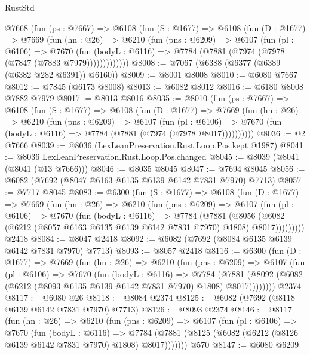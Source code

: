 \begin{lexlean}{RustStd}
\begin{coremodule}
    @7668
      (fun (ps : @7667) =>
      @6108
        (fun (S : @1677) =>
        @6108
          (fun (D : @1677) =>
          @7669
            (fun (hn : @26) =>
            @6210
              (fun (pns : @6209) =>
              @6107
                (fun (pl : @6106) =>
                @7670
                  (fun (bodyL : @6116) =>
                  @7784 (@7881 (@7974 (@7978 (@7847 (@7883 @7979)))))))))))))
@8008 := @7067 (@6388 (@6377 (@6389 (@6382 @282 @6391)) @6160))
@8009 := @8001 @8008
@8010 := @6080 @7667
@8012 := @7845 (@6173 @8008)
@8013 := @6082 @8012
@8016 := @6180 @8008 @7882 @7979
@8017 := @8013 @8016
@8035 := @8010
    (fun (ps : @7667) =>
    @6108
      (fun (S : @1677) =>
      @6108
        (fun (D : @1677) =>
        @7669
          (fun (hn : @26) =>
          @6210
            (fun (pns : @6209) =>
            @6107
              (fun (pl : @6106) =>
              @7670 (fun (bodyL : @6116) => @7784 (@7881 (@7974 (@7978 @8017))))))))))
@8036 := @2 @7666
@8039 := @8036 (LexLeanPreservation.Rust.Loop.Pos.kept @1987)
@8041 := @8036 LexLeanPreservation.Rust.Loop.Pos.changed
@8045 := @8039 (@8041 (@8041 (@13 @7666)))
@8046 := @8035 @8045
@8047 := @7694 @8045
@8056 := @6082 (@7692 (@8047 @6163 @6135 @6139 @6142 @7831 @7970) @7713)
@8057 := @7717 @8045
@8083 := @6300
    (fun (S : @1677) =>
    @6108
      (fun (D : @1677) =>
      @7669
        (fun (hn : @26) =>
        @6210
          (fun (pns : @6209) =>
          @6107
            (fun (pl : @6106) =>
            @7670
              (fun (bodyL : @6116) =>
              @7784
                (@7881
                  (@8056
                    (@6082 (@6212 (@8057 @6163 @6135 @6139 @6142 @7831 @7970) @1808) @8017)))))))))
    @2418
@8084 := @8047 @2418
@8092 := @6082 (@7692 (@8084 @6135 @6139 @6142 @7831 @7970) @7713)
@8093 := @8057 @2418
@8116 := @6300
    (fun (D : @1677) =>
    @7669
      (fun (hn : @26) =>
      @6210
        (fun (pns : @6209) =>
        @6107
          (fun (pl : @6106) =>
          @7670
            (fun (bodyL : @6116) =>
            @7784
              (@7881 (@8092 (@6082 (@6212 (@8093 @6135 @6139 @6142 @7831 @7970) @1808) @8017))))))))
    @2374
@8117 := @6080 @26
@8118 := @8084 @2374
@8125 := @6082 (@7692 (@8118 @6139 @6142 @7831 @7970) @7713)
@8126 := @8093 @2374
@8146 := @8117
    (fun (hn : @26) =>
    @6210
      (fun (pns : @6209) =>
      @6107
        (fun (pl : @6106) =>
        @7670
          (fun (bodyL : @6116) =>
          @7784 (@7881 (@8125 (@6082 (@6212 (@8126 @6139 @6142 @7831 @7970) @1808) @8017)))))))
    @570
@8147 := @6080 @6209

\end{coremodule}
\end{lexlean}
